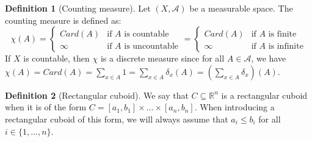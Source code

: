 \documentclass{article}
\newtheorem{theorem}{Theorem}[section]
\theoremstyle{definition}
\newtheorem{definition}{Definition}[section]
\theoremstyle{remark}
\theoremstyle{example}
\newcommand{\tif}{\text{if }}
\begin{document}
\begin{definition}[Counting measure]
    Let $(X, \mathcal{A})$ be a measurable space. The counting measure is defined as:
        $$\chi(A) = \begin{cases} Card(A) & \tif A \text{ is countable}\\ \infty & \tif A \text{ is uncountable}\end{cases} = \begin{cases}Card(A) & \tif A \text{ is finite}\\ \infty & \tif A \text{ is infinite}\end{cases}$$
    If $X$ is countable, then $\chi$ is a discrete measure since for all $A \in \mathcal{A}$, we have $\chi(A) = Card(A) = \sum_{x \in A} 1 = \sum_{x \in A} \delta_x(A) = \left(\sum_{x \in A} \delta_x\right)(A)$.
\end{definition}


\begin{definition}[Rectangular cuboid]
	We say that $C \subseteq \mathbb{R}^n$ is a rectangular cuboid when it is of the form $C = [a_1, b_1] \times \dots \times [a_n, b_n]$. When introducing a rectangular cuboid of this form, we will always assume that $a_i \leq b_i$ for all $i \in \{1, \dots, n\}$.
\end{definition}
\end{document}
